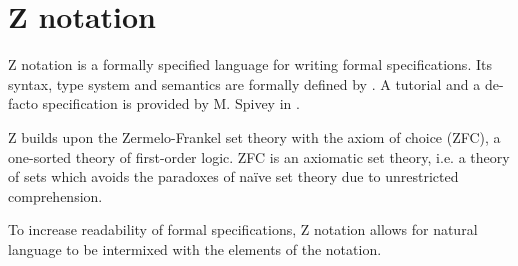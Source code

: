 \section*{Z notation}


Z notation is a formally specified language for writing formal specifications.
Its syntax, type system and semantics are formally defined by \cite{iso-z}. A
tutorial and a de-facto specification is provided by M. Spivey in \cite{zrm}.

Z builds upon the Zermelo-Frankel set theory with the axiom of choice (ZFC), a
one-sorted theory of first-order logic. ZFC is an axiomatic set theory, i.e. a
theory of sets which avoids the paradoxes of na\"ive set theory due to
unrestricted comprehension.

To increase readability of formal specifications, Z notation allows for natural
language to be intermixed with the elements of the notation.

